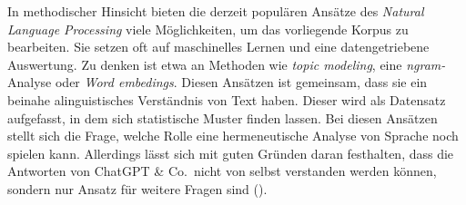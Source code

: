 In methodischer Hinsicht bieten die derzeit populären Ansätze des \textit{Natural Language Processing} viele Möglichkeiten, um das vorliegende Korpus zu bearbeiten. Sie setzen oft auf maschinelles Lernen und eine datengetriebene Auswertung. Zu denken ist etwa an Methoden wie \textit{topic modeling}, eine \textit{ngram-}Analyse oder \textit{Word embedings}. Diesen Ansätzen ist gemeinsam, dass sie ein beinahe alinguistisches Verständnis von Text haben. Dieser wird als Datensatz aufgefasst, in dem sich statistische Muster finden lassen. Bei diesen Ansätzen stellt sich die Frage, welche Rolle eine hermeneutische Analyse von Sprache noch spielen kann. Allerdings lässt sich mit guten Gründen daran festhalten, dass die Antworten von ChatGPT \string& Co.~nicht von selbst verstanden werden können, sondern nur Ansatz für weitere Fragen sind (\cite{bubenhofer_wenn_2018}).